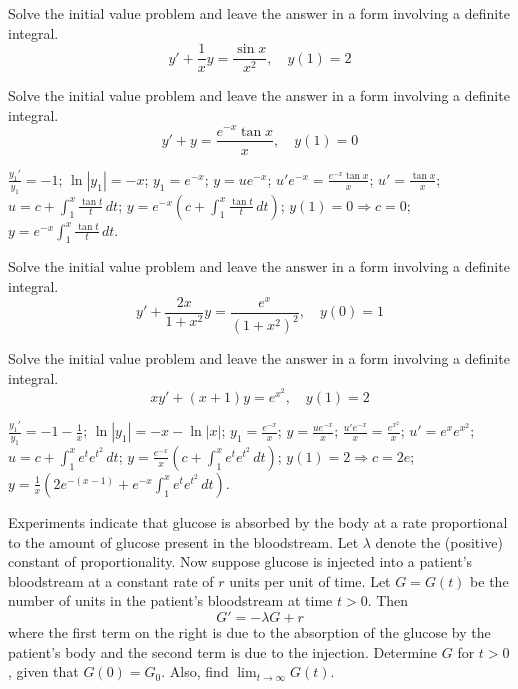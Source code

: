 \documentclass{ximera}
\begin{document}
\begin{problem}\label{exer:2.1.39} Solve the initial value problem and leave the answer in a form involving a definite integral.
$$y'+\frac{1}{x}y=\frac{\sin x}{x^2},\quad y(1)=2$$
\end{problem}

\begin{problem}\label{exer:2.1.40} Solve the initial value problem and leave the answer in a form involving a definite integral.
$$y'+y=\frac{e^{-x}\tan x}{x},\quad y(1)=0$$



\begin{solution}
    $\frac{y_1'}{ y_1}=-1$;\quad
$\ln|y_1|=-x$;\quad
$y_1=e^{-x}$;\quad
$y=ue^{-x}$;\quad
$u'e^{-x}=\frac{e^{-x}\tan x}{ x}$;\quad
$u'=\frac{\tan x}{ x}$;\quad
$u=c+\int_1^x\frac{\tan t}{ t}\,dt$;\quad
$y=e^{-x}\left(c+\int_1^x\frac{\tan t}{ t}\,dt\right)$;\quad
$y(1)=0\Rightarrow c=0$;\quad
$y=e^{-x}\int_1^x\frac{\tan t}{ t}\,dt$.
\end{solution}
\end{problem}

\begin{problem}\label{exer:2.1.41} Solve the initial value problem and leave the answer in a form involving a definite integral.
$$y'+\frac{2x}{1+x^2}y=\frac{e^x}{(1+x^2)^2}, \quad y(0)=1$$
\end{problem}

\begin{problem}\label{exer:2.1.42} Solve the initial value problem and leave the answer in a form involving a definite integral.
$$xy'+(x+1)y=e^{x^2},\quad y(1)=2$$



\begin{solution}
    $\frac{y_1'}{ y_1}=-1-\frac{1}{ x}$;\quad
$\ln|y_1|=-x-\ln|x|$;\quad
$y_1=\frac{e^{-x}}{ x}$;\quad
$y=\frac{ue^{-x}}{ x}$;\quad
$\frac{u'e^{-x}}{ x}=\frac{e^{x^2}}{ x}$;\quad
$u'=e^xe^{x^2}$;\quad
$u=c+\int_1^xe^te^{t^2}\,dt$;\quad
$y=\frac{e^{-x}}{ x}\left(c+\int_1^xe^te^{t^2}\,dt\right)$;\quad
$y(1)=2\Rightarrow c=2e$;\quad
$y=\frac{1}{x}\left(2e^{-(x-1)}+e^{-x}\int_1^xe^te^{t^2}\,dt\right)$.
\end{solution}
\end{problem}

\begin{problem}\label{exer:2.1.43}
Experiments indicate that glucose is absorbed by the body at a rate proportional to the amount of glucose present in the bloodstream. Let $\lambda$ denote the (positive) constant of proportionality. Now suppose glucose is injected into a patient's bloodstream at a constant rate of $r$ units per unit of time. Let $G=G(t)$ be the number of units in the patient's bloodstream at time $t>0$. Then
$$G'=-\lambda G+r$$
where the first term on the right is due to the absorption of the glucose by the patient's body and the second term is due to the injection. Determine $G$ for $t>0$, given that $G(0)=G_0$. Also, find $\lim_{t\to\infty}G(t)$.
\end{problem}
\end{document}
